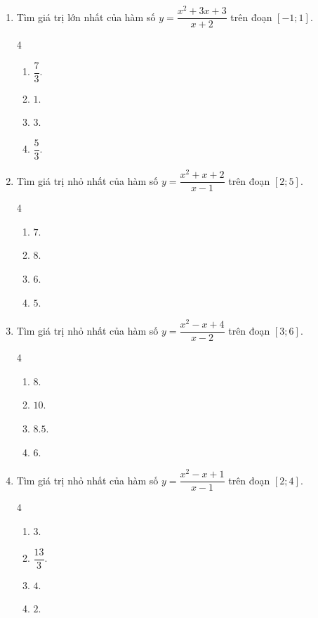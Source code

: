 \documentclass[12pt]{article}
\begin{document}
\begin{enumerate}[label=\textbf{Câu \arabic*.}]
		\item Tìm giá trị lớn nhất của hàm số $y = \dfrac{x^2 + 3x + 3}{x + 2}$ trên đoạn $[-1; 1]$.
		\begin{multicols}{4}
			\begin{enumerate}[label=\textbf{\Alph*.}]
				\item $\dfrac{7}{3}$.
				\item $1$.
				\item $3$.
				\item $\dfrac{5}{3}$.
			\end{enumerate}
		\end{multicols}
		
		\item Tìm giá trị nhỏ nhất của hàm số $y = \dfrac{x^2 + x + 2}{x - 1}$ trên đoạn $[2; 5]$.
		\begin{multicols}{4}
			\begin{enumerate}[label=\textbf{\Alph*.}]
				\item $7$.
				\item $8$.
				\item $6$.
				\item $5$.
			\end{enumerate}
		\end{multicols}
		
		\item Tìm giá trị nhỏ nhất của hàm số $y = \dfrac{x^2 - x + 4}{x - 2}$ trên đoạn $[3; 6]$.
		\begin{multicols}{4}
			\begin{enumerate}[label=\textbf{\Alph*.}]
				\item $8$.
				\item $10$.
				\item $8.5$.
				\item $6$.
			\end{enumerate}
		\end{multicols}
		
		\item Tìm giá trị nhỏ nhất của hàm số $y = \dfrac{x^2 - x + 1}{x - 1}$ trên đoạn $[2; 4]$.
		\begin{multicols}{4}
			\begin{enumerate}[label=\textbf{\Alph*.}]
				\item $3$.
				\item $\dfrac{13}{3}$.
				\item $4$.
				\item $2$.
			\end{enumerate}
		\end{multicols}
		

\end{enumerate}
\end{document}
